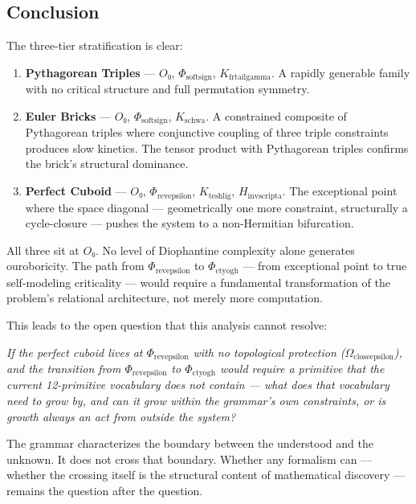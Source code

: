 \documentclass[12pt,a4paper]{article}
\begin{document}
\subsection{Conclusion}

The three-tier stratification is clear:

\begin{enumerate}
    \item \textbf{Pythagorean Triples} --- $O₀$, $\Phi_{\text{softsign}}$, $K_{\text{frtailgamma}}$. A rapidly generable family with no critical structure and full permutation symmetry.
    \item \textbf{Euler Bricks} --- $O₀$, $\Phi_{\text{softsign}}$, $K_{\text{schwa}}$. A constrained composite of Pythagorean triples where conjunctive coupling of three triple constraints produces slow kinetics. The tensor product with Pythagorean triples confirms the brick's structural dominance.
    \item \textbf{Perfect Cuboid} --- $O₀$, $\Phi_{\text{revepsilon}}$, $K_{\text{teshlig}}$, $H_{\text{invscripta}}$. The exceptional point where the space diagonal --- geometrically one more constraint, structurally a cycle-closure --- pushes the system to a non-Hermitian bifurcation.
\end{enumerate}

All three sit at $O₀$. No level of Diophantine complexity alone generates ouroboricity. The path from $\Phi_{\text{revepsilon}}$ to $\Phi_{\text{ctyogh}}$ --- from exceptional point to true self-modeling criticality --- would require a fundamental transformation of the problem's relational architecture, not merely more computation.

This leads to the open question that this analysis cannot resolve:

\emph{If the perfect cuboid lives at $\Phi_{\text{revepsilon}}$ with no topological protection ($\Omega_{\text{closeepsilon}}$), and the transition from $\Phi_{\text{revepsilon}}$ to $\Phi_{\text{ctyogh}}$ would require a primitive that the current 12-primitive vocabulary does not contain --- what does that vocabulary need to grow by, and can it grow within the grammar's own constraints, or is growth always an act from outside the system?}

The grammar characterizes the boundary between the understood and the unknown. It does not cross that boundary. Whether any formalism can --- whether the crossing itself is the structural content of mathematical discovery --- remains the question after the question.
\end{document}
